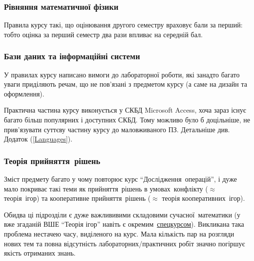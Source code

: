 \documentclass[14pt, a4paper]{extarticle}  %
\begin{document}
\subsubsection{Рівняння математичної фізики}

Правила курсу такі, що оцінювання другого семестру враховує бали за перший: тобто оцінка за перший семестр два рази впливає на середній бал.

\subsubsection{Бази даних та інформаційні системи}
У правилах курсу написано вимоги до лабораторної роботи, які занадто багато уваги приділяють речам, що не пов'язані з предметом курсу (а саме на дизайн  та оформлення). 

Практична частина курсу виконується у СКБД Microsoft Access, хоча зараз існує багато більш популярних і доступних СКБД. Тому можливо було б доцільніше, не прив'язувати суттєву частину курсу до маловживаного ПЗ. Детальніше див. Додаток (\ref{Languages}).

\subsubsection{Теорія прийняття~рішень}
Зміст предмету багато у чому повторює курс ``Дослідження~операцій'', і дуже мало покриває такі теми як прийняття~рішень в умовах~конфлікту ($\approx$ теорія~ігор) та кооперативне прийняття~рішень ($\approx$ теорія кооперативних~ігор). 

Обидва ці підрозділи є  дуже важлививими складовими сучасної~математики (у вже згаданій ВШЕ ``Теорія ігор'' навіть є окремим~\href{https://www.coursera.org/learn/game-theory}{спецкурсом}). 
Викликана така проблема нестачею часу, виділеного на курс.
Мала кількість пар на розгляди нових тем та повна відсутність лабораторних/практичних робіт значно погіршує якість отриманих знань. 



\end{document}

